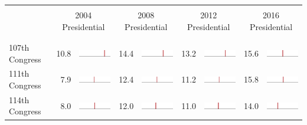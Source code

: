 
\begin{table}
\renewcommand{\arraystretch}{0.7}
 \begin{tabular}{l rm{7em} rm{7em} rm{7em} rm{7em}}
\hline \hline \\

{} & \multicolumn{2}{c}{2004 Presidential} & \multicolumn{2}{c}{2008 Presidential} & \multicolumn{2}{c}{2012 Presidential} & \multicolumn{2}{c}{2016 Presidential} \\

\\ \hline \\
107th Congress         &  10.8 &          \includegraphics[width=7em]{mini_hist/TX_2004_107} &  14.4 &          \includegraphics[width=7em]{mini_hist/TX_2008_107} &  13.2 &          \includegraphics[width=7em]{mini_hist/TX_2012_107} &  15.6 &          \includegraphics[width=7em]{mini_hist/TX_2016_107} \\
111th Congress         &   7.9 &          \includegraphics[width=7em]{mini_hist/TX_2004_111} &  12.4 &          \includegraphics[width=7em]{mini_hist/TX_2008_111} &  11.2 &          \includegraphics[width=7em]{mini_hist/TX_2012_111} &  15.8 &          \includegraphics[width=7em]{mini_hist/TX_2016_111} \\
114th Congress         &   8.0 &          \includegraphics[width=7em]{mini_hist/TX_2004_114} &  12.0 &          \includegraphics[width=7em]{mini_hist/TX_2008_114} &  11.0 &          \includegraphics[width=7em]{mini_hist/TX_2012_114} &  14.0 &          \includegraphics[width=7em]{mini_hist/TX_2016_114} \\

\end{tabular}
\end{table}
